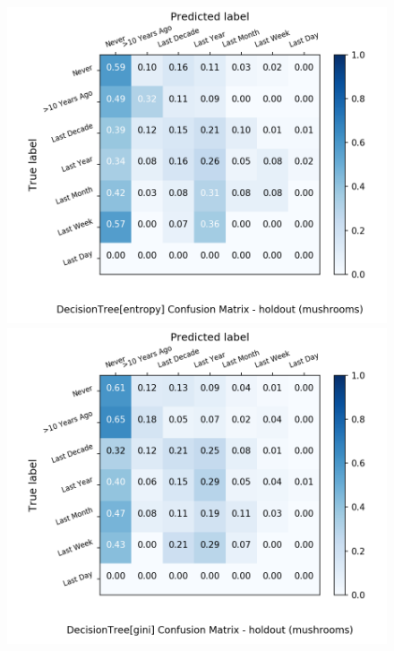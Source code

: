 \begin{figure}[H]
	\centering
	\begin{minipage}[b]{0.32\textwidth}
		\includegraphics[width=1.1\textwidth]{Plots/drugs/mushrooms_DecisionTree_entropy_balance_False_holdout.png}
	\end{minipage}
	\begin{minipage}[b]{0.32\textwidth}
		\includegraphics[width=1.1\textwidth]{Plots/drugs/mushrooms_DecisionTree_gini_balance_False_holdout.png}
	\end{minipage}

\end{figure}
